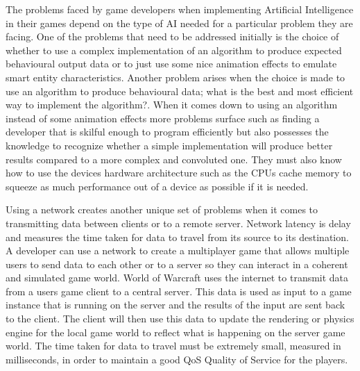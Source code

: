 \documentclass[12pt,a4paper,titlepage]{article}
\begin{document}
The problems faced by game developers when implementing Artificial Intelligence in their games depend on the type of AI needed for a particular problem they are facing. One of the problems that need to be addressed initially is the choice of whether to use a complex implementation of an algorithm to produce expected behavioural output data or to just use some nice animation effects to emulate smart entity characteristics. Another problem arises when the choice is made to use an algorithm to produce behavioural data; what is the best and most efficient way to implement the algorithm?. When it comes down to using an algorithm instead of some animation effects more problems surface such as finding a developer that is skilful enough to program efficiently but also possesses the knowledge to recognize whether a simple implementation will produce better results compared to a more complex and convoluted one. They must also know how to use the devices hardware architecture such as the CPUs cache memory to squeeze as much performance out of a device as possible if it is needed. 

Using a network creates another unique set of problems when it comes to transmitting data between clients or to a remote server. Network latency is delay and measures the time taken for data to travel from its source to its destination\cite{networklatency}. A developer can use a network to create a multiplayer game that allows multiple users to send data to each other or to a server so they can interact in a coherent and simulated game world. World of Warcraft\cite{worldofwarcraft} uses the internet to transmit data from a users game client to a central server. This data is used as input to a game instance that is running on the server and the results of the input are sent back to the client. The client will then use this data to update the rendering or physics engine for the local game world to reflect what is happening on the server game world. The time taken for data to travel must be extremely small, measured in milliseconds, in order to maintain a good QoS Quality of Service for the players.
\end{document}
